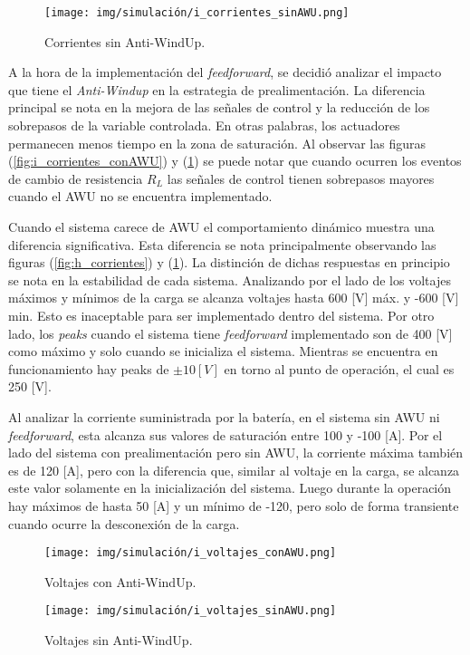 \begin{figure}[H]
    \centering
    \texttt{[image: img/simulación/i\_corrientes\_sinAWU.png]}
    \caption{Corrientes sin Anti-WindUp.}
    \label{fig:i_corrientes_sinAWU}
\end{figure}

A la hora de la implementación del \textit{feedforward}, se decidió 
analizar el impacto que tiene el \textit{Anti-Windup} en la estrategia de prealimentación.
La diferencia principal se nota en la mejora de las señales de control y la reducción de los sobrepasos de la 
variable controlada. En otras palabras, los actuadores permanecen menos tiempo en la zona de saturación.
Al observar las figuras (\ref{fig:i_corrientes_conAWU}) y (\ref{fig:i_corrientes_sinAWU})
se puede notar que cuando ocurren los eventos de cambio de resistencia $R_L$ las señales de control
tienen sobrepasos mayores cuando el AWU no se encuentra implementado. 

Cuando el sistema carece de AWU el comportamiento dinámico 
muestra una diferencia significativa. Esta diferencia se nota principalmente observando las 
figuras (\ref{fig:h_corrientes}) y (\ref{fig:i_corrientes_sinAWU}).
La distinción de dichas respuestas en principio se nota en la estabilidad de cada sistema. Analizando por el lado de los
voltajes máximos y mínimos de la carga se alcanza voltajes hasta 600 [V] máx. y -600 [V] min. Esto es inaceptable
para ser implementado dentro del sistema. Por otro lado, los \textit{peaks} cuando el sistema tiene \textit{feedforward}
implementado son de 400 [V] como máximo y solo cuando se inicializa el sistema. Mientras se encuentra en funcionamiento
hay peaks de $\pm 10 [V]$ en torno al punto de operación, el cual es 250 [V].

Al analizar la corriente suministrada por la batería, en el sistema sin AWU ni \textit{feedforward}, esta alcanza sus
valores de saturación entre 100 y -100 [A]. Por el lado del sistema con prealimentación pero sin AWU, la corriente máxima
también es de 120 [A], pero con la diferencia que, similar al voltaje en la carga, se alcanza este valor solamente en
la inicialización del sistema. Luego durante la operación hay máximos de hasta 50 [A] y un mínimo de -120, pero solo de forma 
transiente cuando ocurre la desconexión de la carga.


\begin{figure}[H]
    \centering
    \texttt{[image: img/simulación/i\_voltajes\_conAWU.png]}
    \caption{Voltajes con Anti-WindUp.}
    \label{fig:i_voltajes_conAWU}
\end{figure}

\begin{figure}[H]
    \centering
    \texttt{[image: img/simulación/i\_voltajes\_sinAWU.png]}
    \caption{Voltajes sin Anti-WindUp.}
    \label{fig:i_voltajes_sinAWU}
\end{figure}

\newpage